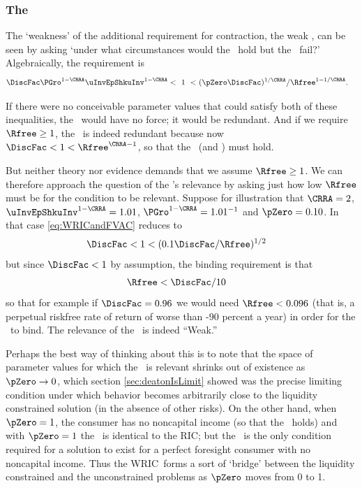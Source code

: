 \documentclass[BufferStockTheory]{subfiles}
\begin{document}
\subsubsection{The \WRIC}

The `weakness' of the additional requirement for contraction, the
weak \RIC, can be seen by asking `under what circumstances
would the \FVAC~hold but the \WRIC~fail?'
Algebraically, the requirement is
\begin{align}
  \DiscFac \PGro^{1-\CRRA}\uInvEpShkuInv^{1-\CRRA} & < ~ 1 ~ <  (\pZero \DiscFac)^{1/\CRRA}/\Rfree^{1-1/\CRRA}. \label{eq:WRICandFVAC}
\end{align}

If there were no conceivable parameter values that could satisfy both
of these inequalities, the \WRIC~would have no force; it would be
redundant.  And if we require $\Rfree \geq 1$, the \WRIC~is indeed
redundant because now $\DiscFac <1<\Rfree^{\CRRA-1}$, so that the \RIC~(and \WRIC) must hold.

But neither theory nor evidence demands that we assume $\Rfree \geq
1$.  We can therefore approach the question of the \WRIC's relevance by
asking just how low $\Rfree$ must be for the condition to be relevant.
Suppose for illustration that $\CRRA=2$, $\uInvEpShkuInv^{1-\CRRA}=1.01$,
$\PGro^{1-\CRRA}=1.01^{-1}$ and $\pZero = 0.10$.  In that case
\eqref{eq:WRICandFVAC} reduces to
\begin{align}
  \DiscFac  & < 1 < (0.1 \DiscFac/\Rfree)^{1/2} \notag
\end{align}
but since $\DiscFac < 1$ by assumption, the binding requirement is that
\begin{align}
  \Rfree  & < \DiscFac/10 \notag
\end{align}
so that for example if $\DiscFac=0.96$ we would need $\Rfree < 0.096$
(that is, a perpetual riskfree rate of return of worse than -90
percent a year) in order for the \WRIC~to bind.
The relevance of the \WRIC~is indeed ``Weak.''

Perhaps the best way of thinking about this is to note that the space
of parameter values for which the \WRIC~is relevant shrinks out of
existence as $\pZero \rightarrow 0$, which section
\ref{sec:deatonIsLimit} showed was the precise limiting condition
under which behavior becomes arbitrarily close to the liquidity
constrained solution (in the absence of other risks).  On the other
hand, when $\pZero = 1$, the consumer has no noncapital income (so
that the \FHWC~holds) and with $\pZero=1$ the \WRIC~is identical to the
RIC; but the \RIC~is
the only condition required for a solution to exist
for a perfect foresight consumer with no noncapital income.  Thus the
WRIC~forms a sort of `bridge' between the liquidity constrained and
the unconstrained problems as $\pZero$ moves from 0 to 1.
\end{document}
